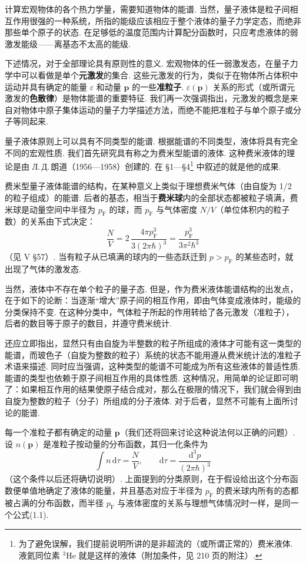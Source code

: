 计算宏观物体的各个热力学量，需要知道物体的能谱. 当然，量子液体是粒子间相互作用很强的一种系统，所指的能级应该相应于整个液体的量子力学定态，而绝非那些单个原子的状态. 在足够低的温度范围内计算配分函数时，只应考虑液体的弱激发能级——离基态不太高的能级.

下述情况，对于全部理论具有原则性的意义. 宏观物体的任一弱激发态，在量子力学中可以看做是单个\textbf{元激发}的集合. 这些元激发的行为，类似于在物体所占体积中运动并具有确定的能量 $\varepsilon$ 和动量 $\bm p$ 的一些\textbf{准粒子}. $\varepsilon(\bm p)$ 关系的形式（或所谓元激发的\textbf{色散律}）是物体能谱的重要特征. 我们再一次强调指出，元激发的概念是来自对物体中原子集体运动的量子力学描述方法，而绝不能把准粒子与单个原子或分子等同起来.

量子液体原则上可以具有不同类型的能谱. 根据能谱的不同类型，液体将具有完全不同的宏观性质. 我们首先研究具有称之为费米型能谱的液体. 这种费米液体的理论是由 Л.\,Д.\,朗道（1956—1958）创建的. 在 §1—§4\footnote{为了避免误解，我们提前说明所讲的是非超流的（或所谓正常的）费米液体. 液氦同位素 $^{3}$He 就是这样的液体（附加条件，见 210 页的附注）.} 中叙述的就是他的成果.

费米型量子液体能谱的结构，在某种意义上类似于理想费米气体（由自旋为 1/2 的粒子组成）的能谱. 后者的基态，相当于\textbf{费米球}内的全部状态都被粒子填满，费米球是动量空间中半径为 $p_{\mathrm F}$ 的球，而 $p_{\mathrm F}$ 与气体密度 $N/V$（单位体积内的粒子数）的关系由下式决定：
\begin{equation}
\frac{N}{V}=2\,\frac{4\pi p_{\mathrm F}^{3}}{3(2\pi\hbar)^{3}}=\frac{p_{\mathrm F}^{3}}{3\pi^{2}\hbar^{3}}
\end{equation}
（见 V §57）. 当有粒子从已填满的球内的一些态跃迁到 $p>p_{\mathrm F}$ 的某些态时，就出现了气体的激发态.

当然，液体中不存在单个粒子的量子态. 但是，作为费米液体能谱结构的出发点，在于如下的论断：当逐渐“增大”原子间的相互作用，即由气体变成液体时，能级的分类保持不变. 在这种分类中，气体粒子所起的作用转给了各元激发（准粒子），后者的数目等于原子的数目，并遵守费米统计.

还应立即指出，显然只有由自旋为半整数的粒子所组成的液体才可能有这一类型的能谱，而玻色子（自旋为整数的粒子）系统的状态不能用遵从费米统计法的准粒子术语来描述. 同时应当强调，这种类型的能谱不可能成为所有这些液体的普适性质. 能谱的类型也依赖于原子间相互作用的具体性质. 这种情况，用简单的论证即可明了：如果相互作用的结果使原子结合成对，那么在极限的情况下，我们就会得到由自旋为整数的粒子（分子）所组成的分子液体. 对于后者，显然不可能有上面所讨论的能谱.

每一个准粒子都有确定的动量 $\bm p$（我们还将回来讨论这种说法何以正确的问题）. 设 $n(\bm p)$ 是准粒子按动量的分布函数，其归一化条件为
\begin{equation*}
\int n\,\mathrm{d}\tau=\frac{N}{V},\qquad \mathrm{d}\tau=\frac{\mathrm{d}^{3}p}{(2\pi\hbar)^{3}}
\end{equation*}
（这个条件以后还将确切说明）. 上面提到的分类原则，在于假设给出这个分布函数便单值地确定了液体的能量，并且基态对应于半径为 $p_{\mathrm F}$ 的费米球内所有的态都被占满的分布函数，而半径 $p_{\mathrm F}$ 与液体密度的关系与理想气体情况时一样，是同一个公式(1.1).

